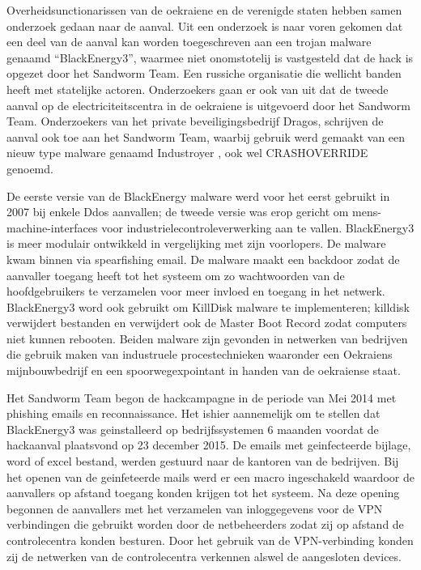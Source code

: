 		Overheidsunctionarissen van de oekraiene en de verenigde staten hebben samen onderzoek gedaan
		naar de aanval. Uit een onderzoek is naar voren gekomen dat een deel van de aanval kan worden
		toegeschreven aan een trojan malware genaamd “BlackEnergy3”, waarmee niet onomstotelij is
		vastgesteld dat de hack is opgezet door het Sandworm Team. Een russiche organisatie die wellicht
		banden heeft met statelijke actoren. Onderzoekers gaan er ook van uit dat de tweede aanval op de
		electriciteitscentra in de oekraiene is uitgevoerd door het Sandworm Team. Onderzoekers van het
		private beveiligingsbedrijf Dragos, schrijven de aanval ook toe aan het Sandworm Team, waarbij
		gebruik werd gemaakt van een nieuw type malware genaamd Industroyer , ook wel CRASHOVERRIDE
		genoemd.
		
		De eerste versie van de BlackEnergy malware werd voor het eerst gebruikt in 2007 bij enkele Ddos
		aanvallen; de tweede versie was erop gericht om mens-machine-interfaces voor
		industrielecontroleverwerking aan te vallen. BlackEnergy3 is meer modulair ontwikkeld in
		vergelijking met zijn voorlopers. De malware kwam binnen via spearfishing email. De malware maakt
		een backdoor zodat de aanvaller toegang heeft tot het systeem om zo wachtwoorden van de
		hoofdgebruikers te verzamelen voor meer invloed en toegang in het netwerk. BlackEnergy3 word
		ook gebruikt om KillDisk malware te implementeren; killdisk verwijdert bestanden en verwijdert ook
		de Master Boot Record zodat computers niet kunnen rebooten. Beiden malware zijn gevonden in
		netwerken van bedrijven die gebruik maken van industruele procestechnieken waaronder een
		Oekraiens mijnbouwbedrijf en een spoorwegexpointant in handen van de oekraiense staat.
		
		Het Sandworm Team begon de hackcampagne in de periode van Mei 2014 met phishing emails en
		reconnaissance. Het ishier aannemelijk om te stellen dat BlackEnergy3 was geinstalleerd op
		bedrijfssystemen 6 maanden voordat de hackaanval plaatsvond op 23 december 2015. De emails
		met geinfecteerde bijlage, word of excel bestand, werden gestuurd naar de kantoren van de
		bedrijven. Bij het openen van de geinfeteerde mails werd er een macro ingeschakeld waardoor de
		aanvallers op afstand toegang konden krijgen tot het systeem. Na deze opening begonnen de
		aanvallers met het verzamelen van inloggegevens voor de VPN verbindingen die gebruikt worden
		door de netbeheerders zodat zij op afstand de controlecentra konden besturen. Door het gebruik van
		de VPN-verbinding konden zij de netwerken van de controlecentra verkennen alswel de aangesloten
		devices.
		
